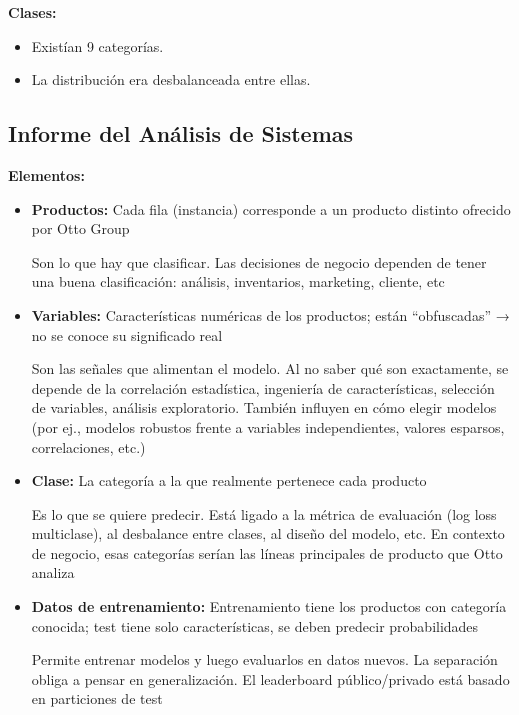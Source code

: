 \documentclass[12pt]{article}%
\begin{document}
\textbf{Clases:}
\begin{itemize}
    \item Existían 9 categorías.
    \item La distribución era desbalanceada entre ellas.
\end{itemize}

\subsection{Informe del Análisis de Sistemas}

\noindent\textbf{\large Elementos: }
\begin{itemize}
    \item \textbf{Productos: }Cada fila (instancia) corresponde a un producto distinto ofrecido por Otto Group

    Son lo que hay que clasificar. Las decisiones de negocio dependen de tener una buena clasificación: análisis, inventarios, marketing, cliente, etc

    \item \textbf{Variables: }Características numéricas de los productos; están “obfuscadas” → no se conoce su significado real

    Son las señales que alimentan el modelo. Al no saber qué son exactamente, se depende de la correlación estadística, ingeniería de características, selección de variables, análisis exploratorio. También influyen en cómo elegir modelos (por ej., modelos robustos frente a variables independientes, valores esparsos, correlaciones, etc.)

    \item \textbf{Clase: }La categoría a la que realmente pertenece cada producto

    Es lo que se quiere predecir. Está ligado a la métrica de evaluación (log loss multiclase), al desbalance entre clases, al diseño del modelo, etc. En contexto de negocio, esas categorías serían las líneas principales de producto que Otto analiza

    \item \textbf{Datos de entrenamiento: }Entrenamiento tiene los productos con categoría conocida; test tiene solo características, se deben predecir probabilidades

    Permite entrenar modelos y luego evaluarlos en datos nuevos. La separación obliga a pensar en generalización. El leaderboard público/privado está basado en particiones de test


\end{itemize}
\end{document}
